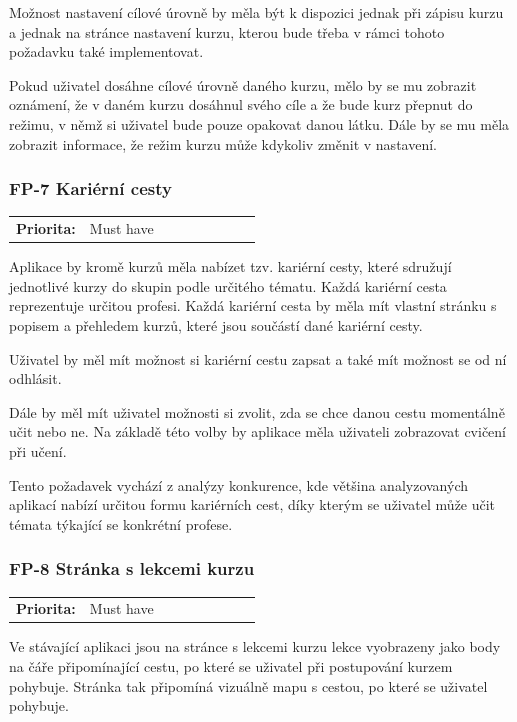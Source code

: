 Možnost nastavení cílové úrovně by měla být k dispozici jednak při zápisu kurzu a jednak na stránce nastavení kurzu, kterou bude třeba v rámci tohoto požadavku také implementovat.

Pokud uživatel dosáhne cílové úrovně daného kurzu, mělo by se mu zobrazit oznámení, že v daném kurzu dosáhnul svého cíle a že bude kurz přepnut do režimu, v němž si uživatel bude pouze opakovat danou látku. Dále by se mu měla zobrazit informace, že režim kurzu může kdykoliv změnit v nastavení.

\subsubsection{FP-7 Kariérní cesty}

\begin{tabular}{lp{0.7\linewidth}}
    \textbf{Priorita:} & Must have \\
\end{tabular}

Aplikace by kromě kurzů měla nabízet tzv. kariérní cesty, které sdružují jednotlivé kurzy do skupin podle určitého tématu. Každá kariérní cesta reprezentuje určitou profesi. Každá kariérní cesta by měla mít vlastní stránku s popisem a přehledem kurzů, které jsou součástí dané kariérní cesty.

Uživatel by měl mít možnost si kariérní cestu zapsat a také mít možnost se od ní odhlásit.

Dále by měl mít uživatel možnosti si zvolit, zda se chce danou cestu momentálně učit nebo ne. Na základě této volby by aplikace měla uživateli zobrazovat cvičení při učení.

Tento požadavek vychází z analýzy konkurence, kde většina analyzovaných aplikací nabízí určitou formu kariérních cest, díky kterým se uživatel může učit témata týkající se konkrétní profese.

\subsubsection{FP-8 Stránka s lekcemi kurzu}

\begin{tabular}{lp{0.7\linewidth}}
    \textbf{Priorita:} & Must have \\
\end{tabular}

Ve stávající aplikaci jsou na stránce s lekcemi kurzu lekce vyobrazeny jako body na čáře připomínající cestu, po které se uživatel při postupování kurzem pohybuje. Stránka tak připomíná vizuálně mapu s cestou, po které se uživatel pohybuje. 

